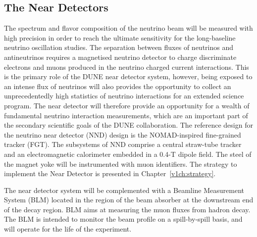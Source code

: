 \subsection{The Near Detectors}
The spectrum and flavor composition of the neutrino beam will be measured with high precision 
in order to reach the ultimate sensitivity for the long-baseline neutrino oscillation studies.
The separation between fluxes of neutrinos and antineutrinos requires a magnetised neutrino detector to 
charge discriminate electrons and muons produced in the neutrino charged current interactions.
This is the primary role of the DUNE near detector system, however, being exposed to an intense flux of neutrinos
will also provides the opportunity to collect an unprecedentedly high statistics of neutrino 
interactions  for an extended science program. 
The near detector will therefore provide an opportunity for a wealth of fundamental neutrino interaction 
measurements, which are an important part of the secondary scientific goals of the DUNE collaboration. 
The reference design for the neutrino near detector (NND) design is the NOMAD-inspired fine-grained tracker (FGT). The subsystems of NND comprise a central 
straw-tube tracker and an electromagnetic calorimeter embedded in a 0.4-T dipole field. The steel of the
magnet yoke will be instrumented with muon identifiers. The strategy to implement
the Near Detector is presented in Chapter~\ref{v1ch:strategy}.

The near detector system will be complemented with a Beamline Measurement System (BLM) located in the region of the beam absorber at the downstream end of the decay region. BLM aims at measuring the muon fluxes from hadron decay.
The BLM is intended to monitor the beam profile on a spill-by-spill basis, and will operate for the life of the experiment.


